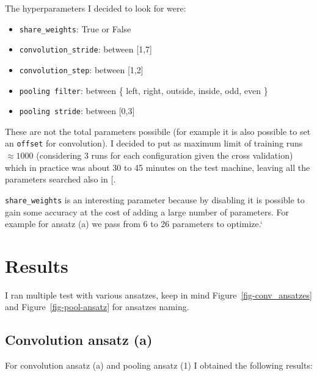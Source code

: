 \documentclass[
  13pt,
  a4paper,
  DIV=11,
  numbers=noendperiod]{scrreprt}
\providecommand{\tightlist}{%
  \setlength{\itemsep}{0pt}\setlength{\parskip}{0pt}}\usepackage{longtable,booktabs,array}
\begin{document}
The hyperparameters I decided to look for were:

\begin{itemize}
\tightlist
\item
  \texttt{share\_weights}: True or False
\item
  \texttt{convolution\_stride}: between {[}1,7{]}
\item
  \texttt{convolution\_step}: between {[}1,2{]}
\item
  \texttt{pooling\ filter}: between \{ left, right, outside, inside,
  odd, even \}
\item
  \texttt{pooling\ stride}: between {[}0,3{]}
\end{itemize}

These are not the total parameters possibile (for example it is also
possible to set an \texttt{offset} for convolution). I decided to put as
maximum limit of training runs \(\approx 1000\) (considering 3 runs for
each configuration given the cross validation) which in practice was
about 30 to 45 minutes on the test machine, leaving all the parameters
searched also in {[}\citeproc{ref-lourens2023hierarchical}{1}{]}.

\texttt{share\_weights} is an interesting parameter because by disabling
it is possible to gain some accuracy at the cost of adding a large
number of parameters. For example for ansatz (a) we pass from 6 to 26
parameters to optimize.`


\chapter{Results}\label{results}

I ran multiple test with various ansatzes, keep in mind
Figure~\ref{fig-conv_ansatzes} and Figure~\ref{fig-pool-ansatz} for
ansatzes naming.

\section{Convolution ansatz (a)}\label{convolution-ansatz-a}

For convolution ansatz (a) and pooling ansatz (1) I obtained the
following results:
\end{document}
